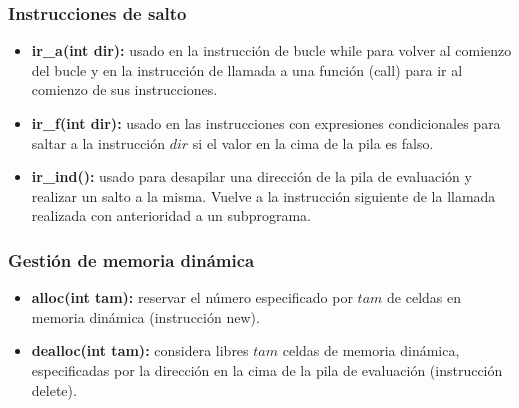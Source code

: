 \documentclass[11pt]{article}
\begin{document}
        \subsubsection*{Instrucciones de salto}
            \begin{itemize}
                \item \textbf{ir\_a(int dir):} usado en la instrucción de bucle while para volver al comienzo del bucle y en la instrucción de llamada a una función (call) para ir al comienzo de sus instrucciones.
                \item \textbf{ir\_f(int dir):} usado en las instrucciones con expresiones condicionales para saltar a la instrucción $dir$ si el valor en la cima de la pila es falso.
                \item \textbf{ir\_ind():} usado para desapilar una dirección de la pila de evaluación y realizar un salto a la misma. Vuelve a la instrucción siguiente de la llamada realizada con anterioridad a un subprograma.
            \end{itemize}
        \subsubsection*{Gestión de memoria dinámica}
            \begin{itemize}
                \item \textbf{alloc(int tam):} reservar el número especificado por $tam$ de celdas en memoria dinámica (instrucción new).
                \item \textbf{dealloc(int tam):} considera libres $tam$ celdas de memoria dinámica, especificadas por la dirección en la cima de la pila de evaluación (instrucción delete).
            \end{itemize}
\end{document}
